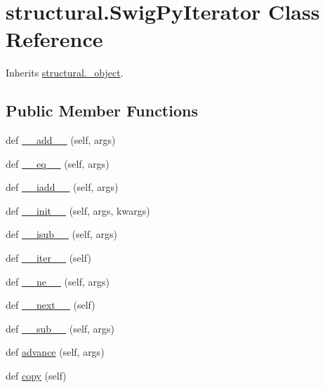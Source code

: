 \hypertarget{classstructural_1_1_swig_py_iterator}{}\section{structural.\+Swig\+Py\+Iterator Class Reference}
\label{classstructural_1_1_swig_py_iterator}


Inherits \hyperlink{classstructural_1_1__object}{structural.\+\_\+object}.

\subsection*{Public Member Functions}
\begin{DoxyCompactItemize}
\item 
def \hyperlink{classstructural_1_1_swig_py_iterator_a65714058f2d811f3f3c4bbbaa8094e29}{\+\_\+\+\_\+add\+\_\+\+\_\+} (self, args)
\item 
def \hyperlink{classstructural_1_1_swig_py_iterator_afd60b96bd258bb329f4a0243688043d6}{\+\_\+\+\_\+eq\+\_\+\+\_\+} (self, args)
\item 
def \hyperlink{classstructural_1_1_swig_py_iterator_afda54078afa5c6529abe07aae3a45bd4}{\+\_\+\+\_\+iadd\+\_\+\+\_\+} (self, args)
\item 
def \hyperlink{classstructural_1_1_swig_py_iterator_a050f056f9b2c92db7b79afcfe11a525b}{\+\_\+\+\_\+init\+\_\+\+\_\+} (self, args, kwargs)
\item 
def \hyperlink{classstructural_1_1_swig_py_iterator_ae8afdeb10fbcb48014ea3cb02167988a}{\+\_\+\+\_\+isub\+\_\+\+\_\+} (self, args)
\item 
def \hyperlink{classstructural_1_1_swig_py_iterator_ac7956bcd94cfec1deddfed4269071563}{\+\_\+\+\_\+iter\+\_\+\+\_\+} (self)
\item 
def \hyperlink{classstructural_1_1_swig_py_iterator_af8e9ffca8b8eb0643a501e88087f9815}{\+\_\+\+\_\+ne\+\_\+\+\_\+} (self, args)
\item 
def \hyperlink{classstructural_1_1_swig_py_iterator_a13f2266e3758bd6c48989200091303dd}{\+\_\+\+\_\+next\+\_\+\+\_\+} (self)
\item 
def \hyperlink{classstructural_1_1_swig_py_iterator_a165aeca2ff7a656fa6a4582a4cd5bf0a}{\+\_\+\+\_\+sub\+\_\+\+\_\+} (self, args)
\item 
def \hyperlink{classstructural_1_1_swig_py_iterator_ab204bbd80f8c1ca6ac4e7ec1992af44f}{advance} (self, args)
\item 
def \hyperlink{classstructural_1_1_swig_py_iterator_a619b98fd0c64343a7977edea1344f949}{copy} (self)

\end{DoxyCompactItemize}
